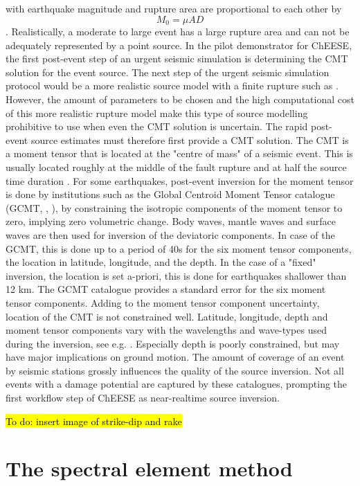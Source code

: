 \documentclass[../Text/00main.tex]{subfiles}
\begin{document}
with earthquake magnitude and rupture area are proportional to each other by $$M_0 = \mu AD$$. Realistically, a moderate to large event has a large rupture area and can not be adequately represented by a point source. In the pilot demonstrator for ChEESE, the first post-event step of an urgent seismic simulation is determining the CMT solution for the event source. The next step of the urgent seismic simulation protocol would be a more realistic source model with a finite rupture such as \cite{graves_kinematic_2016}. However, the amount of parameters to be chosen and the high computational cost of this more realistic rupture model make this type of source modelling prohibitive to use when even the CMT solution is uncertain. The rapid post-event source estimates must therefore first provide a CMT solution. The CMT is a moment tensor that is located at the "centre of mass" of a seismic event. This is usually located roughly at the middle of the fault rupture and at half the source time duration \cite{dziewonski_determination_1981}. For some earthquakes, post-event inversion for the moment tensor is done by institutions such as the Global Centroid Moment Tensor catalogue (GCMT, \cite{ekstromdziewo}, \cite{dziewonski_determination_1981}), by constraining the isotropic components of the moment tensor to zero, implying zero volumetric change. Body waves, mantle waves and surface waves are then used for inversion of the deviatoric components. In case of the GCMT, this is done up to a period of 40s for the six moment tensor components, the location in latitude, longitude, and the depth. In the case of a "fixed" inversion, the location is set a-priori, this is done for earthquakes shallower than 12 km. The GCMT catalogue provides a standard error for the six moment tensor components. Adding to the moment tensor component uncertainty, location of the CMT is not constrained well. Latitude, longitude, depth and moment tensor components vary with the wavelengths and wave-types used during the inversion, see e.g. \cite{valentine_assessing_2012}. Especially depth is poorly constrained, but may have major implications on ground motion. The amount of coverage of an event by seismic stations grossly influences the quality of the source inversion. Not all events with a damage potential are captured by these catalogues, prompting the first workflow step of ChEESE as near-realtime source inversion.

\hl{To do: insert image of strike-dip and rake}

\section{The spectral element method}
\end{document}
